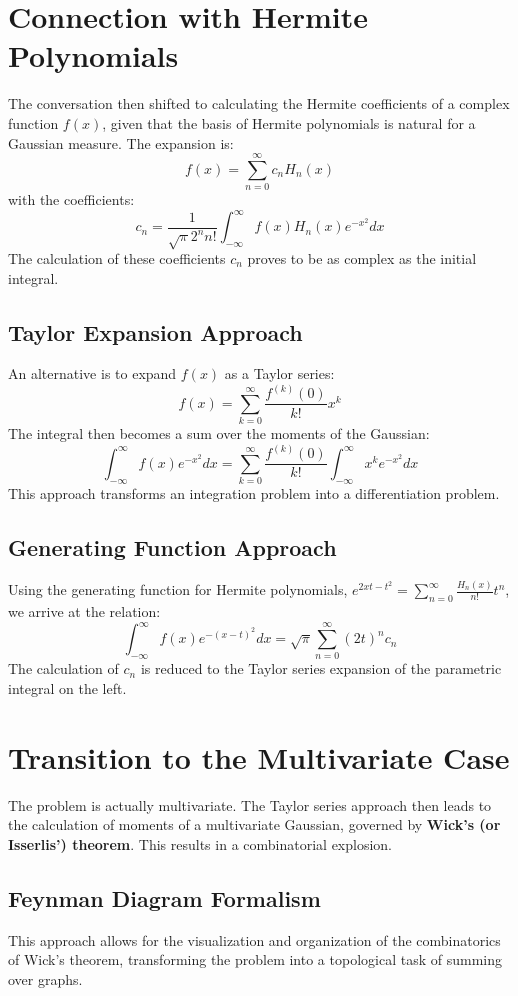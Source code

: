 \documentclass[12pt]{article}
\begin{document}
\section{Connection with Hermite Polynomials}

The conversation then shifted to calculating the Hermite coefficients of a complex function $f(x)$, given that the basis of Hermite polynomials is natural for a Gaussian measure.
The expansion is:
\[
f(x) = \sum_{n=0}^{\infty} c_n H_n(x)
\]
with the coefficients:
\[
c_n = \frac{1}{\sqrt{\pi} 2^n n!} \int_{-\infty}^{\infty} f(x) H_n(x) e^{-x^2} dx
\]
The calculation of these coefficients $c_n$ proves to be as complex as the initial integral.

\subsection{Taylor Expansion Approach}
An alternative is to expand $f(x)$ as a Taylor series:
\[
f(x) = \sum_{k=0}^{\infty} \frac{f^{(k)}(0)}{k!} x^k
\]
The integral then becomes a sum over the moments of the Gaussian:
\[
\int_{-\infty}^{\infty} f(x) e^{-x^2} dx = \sum_{k=0}^{\infty} \frac{f^{(k)}(0)}{k!} \int_{-\infty}^{\infty} x^k e^{-x^2} dx
\]
This approach transforms an integration problem into a differentiation problem.

\subsection{Generating Function Approach}
Using the generating function for Hermite polynomials, $e^{2xt-t^2} = \sum_{n=0}^{\infty} \frac{H_n(x)}{n!} t^n$, we arrive at the relation:
\[
\int_{-\infty}^{\infty} f(x) e^{-(x-t)^2} dx = \sqrt{\pi} \sum_{n=0}^{\infty} (2t)^n c_n
\]
The calculation of $c_n$ is reduced to the Taylor series expansion of the parametric integral on the left.

\section{Transition to the Multivariate Case}

The problem is actually multivariate. The Taylor series approach then leads to the calculation of moments of a multivariate Gaussian, governed by \textbf{Wick's (or Isserlis') theorem}. This results in a combinatorial explosion.

\subsection{Feynman Diagram Formalism}
This approach allows for the visualization and organization of the combinatorics of Wick's theorem, transforming the problem into a topological task of summing over graphs.
\end{document}
